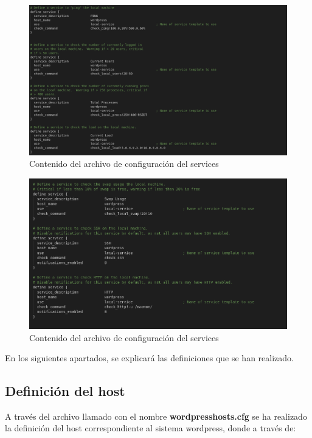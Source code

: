 \begin{figure}[H]
	\centering
	\includegraphics[scale=0.3]{imagenes/wordpress/analisis_naemon/services1.png}
	\caption{Contenido del archivo de configuración del services} \label{services1}
\end{figure}
\newpage
\begin{figure}[H]
	\centering
	\includegraphics[scale=0.3]{imagenes/wordpress/analisis_naemon/services2.png}
	\caption{Contenido del archivo de configuración del services} \label{services2}
\end{figure}
En los siguientes apartados, se explicará las definiciones que se han realizado.
\subsection{Definición del host}

A través del archivo llamado con el nombre \textbf{wordpresshosts.cfg} se ha realizado la definición del host correspondiente al sistema wordpress, donde a través de:

